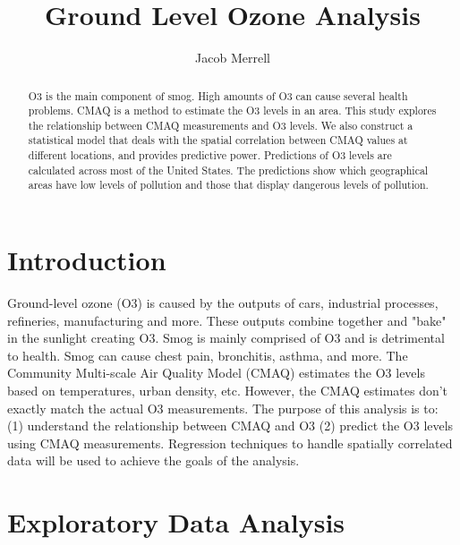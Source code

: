 \documentclass{svproc}
\begin{document}
\mainmatter              %
%


\title{Ground Level Ozone Analysis}
%
%
\author{Jacob Merrell}

\institute{}
%

\maketitle  

\begin{abstract}
   O3 is the main component of smog. High amounts of O3 can cause several health problems. CMAQ is a method to estimate the O3 levels in an area. This study explores the relationship between CMAQ measurements and O3 levels. We also construct a statistical model that deals with the spatial correlation between CMAQ values at different locations, and provides predictive power. Predictions of O3 levels are calculated across most of the United States. The predictions show which geographical areas have low levels of pollution and those that display dangerous levels of pollution.
\end{abstract}

\section{Introduction}

Ground-level ozone (O3) is caused by the outputs of cars, industrial processes, refineries, manufacturing and more. These outputs combine together and "bake" in the sunlight creating O3. Smog is mainly comprised of O3 and is detrimental to health. Smog can cause chest pain, bronchitis, asthma, and more. The Community Multi-scale Air Quality Model (CMAQ) estimates the O3 levels based on temperatures, urban density, etc. However, the CMAQ estimates don't exactly match the actual O3 measurements. The purpose of this analysis is to: (1) understand the relationship between CMAQ and O3 (2) predict the O3 levels using CMAQ measurements. Regression techniques to handle spatially correlated data will be used to achieve the goals of the analysis.

\section{Exploratory Data Analysis}
\end{document}
